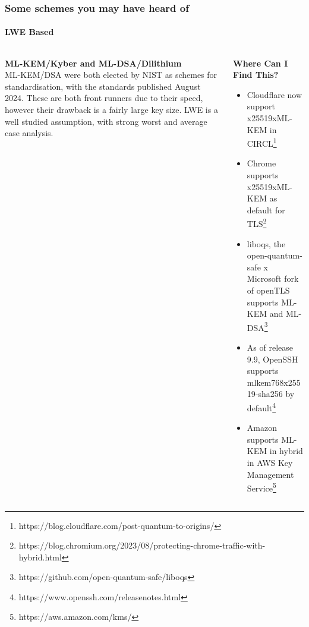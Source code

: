 \documentclass[
aspectratio=169, %
t, %
onlytextwidth, %
10pt, %
]{beamer}
\begin{document}
\begin{frame}
    \frametitle{Some schemes you may have heard of}
    \framesubtitle{LWE Based}

    \begin{columns}[T] %
        \begin{column}{0.42\linewidth} %
            \textbf{ML-KEM/Kyber and ML-DSA/Dilithium}\\
            
            ML-KEM/DSA were both elected by NIST as schemes for standardisation, with the standards published August 2024. These are both front runners due to their speed, however their drawback is a fairly large key size. LWE is a well studied assumption, with strong worst and average case analysis.
        \end{column}
        \begin{column}{0.55\linewidth} %
            \textbf{Where Can I Find This?}\\
            \begin{itemize}
                \item Cloudflare now support x25519xML-KEM in CIRCL\footnote{https://blog.cloudflare.com/post-quantum-to-origins/}
            \item Chrome supports x25519xML-KEM as default for TLS\footnote{https://blog.chromium.org/2023/08/protecting-chrome-traffic-with-hybrid.html}
                \item liboqs, the open-quantum-safe x Microsoft fork of openTLS supports ML-KEM and ML-DSA\footnote{https://github.com/open-quantum-safe/liboqs}
                \item As of release 9.9, OpenSSH supports mlkem768x25519-sha256 by default\footnote{https://www.openssh.com/releasenotes.html}
                \item Amazon supports ML-KEM in hybrid in AWS Key Management Service\footnote{https://aws.amazon.com/kms/}
            \end{itemize}
        \end{column}
    \end{columns}
\end{frame}

\end{document}
